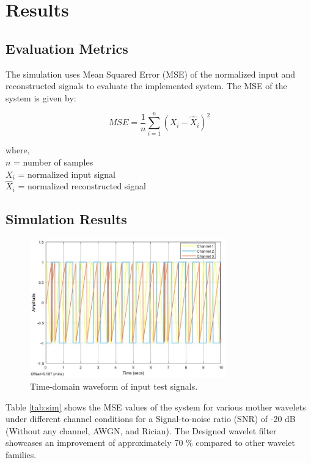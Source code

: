 \documentclass[conference]{IEEEtran}
\begin{document}
\section{Results}
\subsection{Evaluation Metrics}
The simulation uses Mean Squared Error (MSE) of the normalized input and reconstructed signals to evaluate the implemented system. The MSE of the system is given by:

\begin{equation}
    MSE = \frac{1}{n}\sum_{i=1}^{n}(X_i-\hat{X}_i)^2
\end{equation}

where, \\
${n}$ = number of samples \\
$X_{i}$ = normalized input signal \\
$\hat{X}_{i}$ = normalized reconstructed signal

\subsection{Simulation Results}

\begin{figure}[htpb]
    \centering
    \includegraphics[width = 8.5cm]{original_signal.jpg}
    \caption{Time-domain waveform of input test signals.}
    \label{fig:input_signals}
\end{figure}

Table \ref{tab:sim} shows the MSE values of the system for various mother wavelets under different channel conditions for a Signal-to-noise ratio (SNR) of -20 dB (Without any channel, AWGN, and Rician). The Designed wavelet filter showcases an improvement of approximately 70 \% compared to other wavelet families. \par 
\end{document}
